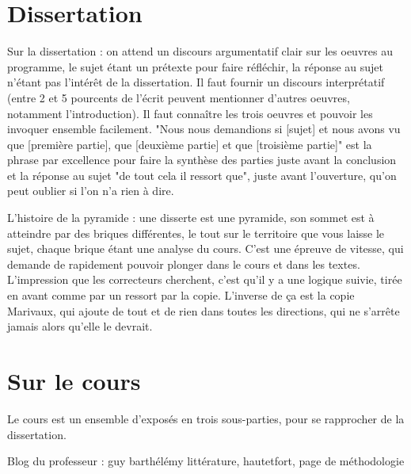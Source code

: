 \documentclass[a4paper,12pt]{book}
\begin{document}
\section{Dissertation}
Sur la dissertation : on attend un discours argumentatif clair sur les oeuvres au programme, le sujet étant un prétexte pour faire réfléchir, la réponse au sujet n'étant pas l'intérêt de la dissertation. Il faut fournir un discours interprétatif (entre 2 et 5 pourcents de l'écrit peuvent mentionner d'autres oeuvres, notamment l'introduction). Il faut connaître les trois oeuvres et pouvoir les invoquer ensemble facilement. "Nous nous demandions si [sujet] et nous avons vu que [première partie], que [deuxième partie] et que [troisième partie]" est la phrase par excellence pour faire la synthèse des parties juste avant la conclusion et la réponse au sujet "de tout cela il ressort que", juste avant l'ouverture, qu'on peut oublier si l'on n'a rien à dire.
\par L'histoire de la pyramide : une disserte est une pyramide, son sommet est à atteindre par des briques différentes, le tout sur le territoire que vous laisse le sujet, chaque brique étant une analyse du cours. C'est une épreuve de vitesse, qui demande de rapidement pouvoir plonger dans le cours et dans les textes. L'impression que les correcteurs cherchent, c'est qu'il y a une logique suivie, tirée en avant comme par un ressort par la copie. L'inverse de ça est la copie Marivaux, qui ajoute de tout et de rien dans toutes les directions, qui ne s'arrête jamais alors qu'elle le devrait.
\section{Sur le cours}
Le cours est un ensemble d'exposés en trois sous-parties, pour se rapprocher de la dissertation. 
\par Blog du professeur : guy barthélémy littérature, hautetfort, page de méthodologie
\end{document}

